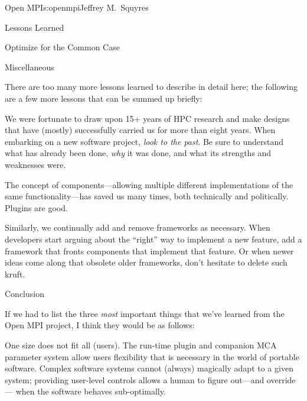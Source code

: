\begin{aosachapter}{Open MPI}{s:openmpi}{Jeffrey M.\ Squyres}
\begin{aosasect1}{Lessons Learned}
\begin{aosasect2}{Optimize for the Common Case}
\end{aosasect2}


\begin{aosasect2}{Miscellaneous}

There are too many more lessons learned to describe in detail here;
the following are a few more lessons that can be summed up briefly:

\begin{aosaitemize}
\item We were fortunate to draw upon 15+ years of HPC research and
  make designs that have (mostly) successfully carried us for more
  than eight years.  When embarking on a new software project,
  \emph{look to the past}.  Be sure to understand what has already
  been done, \emph{why} it was done, and what its strengths and
  weaknesses were.

\item The concept of components---allowing multiple different
  implementations of the same functionality---has saved us many
  times, both technically and politically.  Plugins are good.

\item Similarly, we continually add and remove frameworks as
  necessary.  When developers start arguing about the ``right'' way to
  implement a new feature, add a framework that fronts components that
  implement that feature.  Or when newer ideas come along that
  obsolete older frameworks, don't hesitate to delete such kruft.

\end{aosaitemize}

\end{aosasect2}


\begin{aosasect2}{Conclusion}

If we had to list the three \emph{most} important things that we've
learned from the Open MPI project, I think they would be as follows:

\begin{aosaitemize}
\item One size does not fit all (users).  The run-time plugin and
  companion MCA parameter system allow users flexibility that is
  necessary in the world of portable software.  Complex software
  systems cannot (always) magically adapt to a given system; providing
  user-level controls allows a human to figure out---and override---
  when the software behaves sub-optimally.


\end{aosaitemize}
\end{aosasect2}
\end{aosasect1}
\end{aosachapter}
